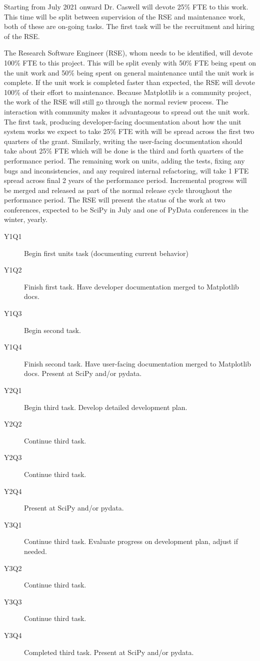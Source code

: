 \documentclass[12pt]{article}
\numberwithin{page}{section}
\begin{document}
Starting from July 2021 onward Dr. Caswell will devote 25\% FTE to
this work.  This time will be split between supervision of the RSE and
maintenance work, both of these are on-going tasks.  The first task
will be the recruitment and hiring of the RSE.

The Research Software Engineer (RSE), whom needs to be identified,
will devote 100\% FTE to this project.  This will be split evenly with
50\% FTE being spent on the unit work and 50\% being spent on general
maintenance until the unit work is complete.  If the unit work is
completed faster than expected, the RSE will devote 100\% of their
effort to maintenance.  Because Matplotlib is a community project, the
work of the RSE will still go through the normal review process.  The
interaction with community makes it advantageous to spread out the
unit work.  The first task, producing developer-facing documentation
about how the unit system works we expect to take 25\% FTE with will
be spread across the first two quarters of the grant.  Similarly,
writing the user-facing documentation should take about 25\% FTE which
will be done is the third and forth quarters of the performance
period.  The remaining work on units, adding the tests, fixing any
bugs and inconsistencies, and any required internal refactoring, will
take 1 FTE spread across final 2 years of the performance period.
Incremental progress will be merged and released as part of the normal
release cycle throughout the performance period.  The RSE will present
the status of the work at two conferences, expected to be SciPy in
July and one of PyData conferences in the winter, yearly.


\begin{description}

\item[Y1Q1] Begin first units task (documenting current behavior)
\item[Y1Q2] Finish first task. Have developer documentation merged to
  Matplotlib docs.
\item[Y1Q3] Begin second task.
\item[Y1Q4] Finish second task. Have user-facing documentation merged
  to Matplotlib docs. Present at SciPy and/or pydata.

\item[Y2Q1] Begin third task.  Develop detailed development plan.
\item[Y2Q2] Continue third task.
\item[Y2Q3] Continue third task.
\item[Y2Q4] Present at SciPy and/or pydata.


\item[Y3Q1] Continue third task. Evaluate progress on development
  plan, adjust if needed.
\item[Y3Q2] Continue third task.
\item[Y3Q3] Continue third task.
\item[Y3Q4] Completed third task. Present at SciPy and/or pydata.

\end{description}
\end{document}
